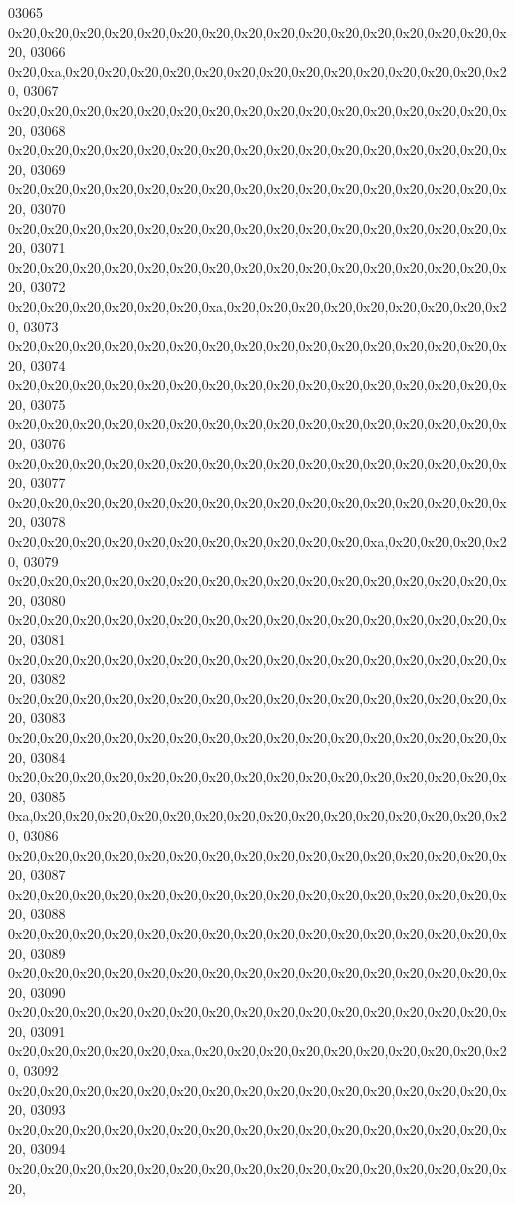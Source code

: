 \begin{DoxyCode}
03065   0x20,0x20,0x20,0x20,0x20,0x20,0x20,0x20,0x20,0x20,0x20,0x20,0x20,0x20,0x20,0x20,
03066   0x20,0xa,0x20,0x20,0x20,0x20,0x20,0x20,0x20,0x20,0x20,0x20,0x20,0x20,0x20,0x20,
03067   0x20,0x20,0x20,0x20,0x20,0x20,0x20,0x20,0x20,0x20,0x20,0x20,0x20,0x20,0x20,0x20,
03068   0x20,0x20,0x20,0x20,0x20,0x20,0x20,0x20,0x20,0x20,0x20,0x20,0x20,0x20,0x20,0x20,
03069   0x20,0x20,0x20,0x20,0x20,0x20,0x20,0x20,0x20,0x20,0x20,0x20,0x20,0x20,0x20,0x20,
03070   0x20,0x20,0x20,0x20,0x20,0x20,0x20,0x20,0x20,0x20,0x20,0x20,0x20,0x20,0x20,0x20,
03071   0x20,0x20,0x20,0x20,0x20,0x20,0x20,0x20,0x20,0x20,0x20,0x20,0x20,0x20,0x20,0x20,
03072   0x20,0x20,0x20,0x20,0x20,0x20,0xa,0x20,0x20,0x20,0x20,0x20,0x20,0x20,0x20,0x20,
03073   0x20,0x20,0x20,0x20,0x20,0x20,0x20,0x20,0x20,0x20,0x20,0x20,0x20,0x20,0x20,0x20,
03074   0x20,0x20,0x20,0x20,0x20,0x20,0x20,0x20,0x20,0x20,0x20,0x20,0x20,0x20,0x20,0x20,
03075   0x20,0x20,0x20,0x20,0x20,0x20,0x20,0x20,0x20,0x20,0x20,0x20,0x20,0x20,0x20,0x20,
03076   0x20,0x20,0x20,0x20,0x20,0x20,0x20,0x20,0x20,0x20,0x20,0x20,0x20,0x20,0x20,0x20,
03077   0x20,0x20,0x20,0x20,0x20,0x20,0x20,0x20,0x20,0x20,0x20,0x20,0x20,0x20,0x20,0x20,
03078   0x20,0x20,0x20,0x20,0x20,0x20,0x20,0x20,0x20,0x20,0x20,0xa,0x20,0x20,0x20,0x20,
03079   0x20,0x20,0x20,0x20,0x20,0x20,0x20,0x20,0x20,0x20,0x20,0x20,0x20,0x20,0x20,0x20,
03080   0x20,0x20,0x20,0x20,0x20,0x20,0x20,0x20,0x20,0x20,0x20,0x20,0x20,0x20,0x20,0x20,
03081   0x20,0x20,0x20,0x20,0x20,0x20,0x20,0x20,0x20,0x20,0x20,0x20,0x20,0x20,0x20,0x20,
03082   0x20,0x20,0x20,0x20,0x20,0x20,0x20,0x20,0x20,0x20,0x20,0x20,0x20,0x20,0x20,0x20,
03083   0x20,0x20,0x20,0x20,0x20,0x20,0x20,0x20,0x20,0x20,0x20,0x20,0x20,0x20,0x20,0x20,
03084   0x20,0x20,0x20,0x20,0x20,0x20,0x20,0x20,0x20,0x20,0x20,0x20,0x20,0x20,0x20,0x20,
03085   0xa,0x20,0x20,0x20,0x20,0x20,0x20,0x20,0x20,0x20,0x20,0x20,0x20,0x20,0x20,0x20,
03086   0x20,0x20,0x20,0x20,0x20,0x20,0x20,0x20,0x20,0x20,0x20,0x20,0x20,0x20,0x20,0x20,
03087   0x20,0x20,0x20,0x20,0x20,0x20,0x20,0x20,0x20,0x20,0x20,0x20,0x20,0x20,0x20,0x20,
03088   0x20,0x20,0x20,0x20,0x20,0x20,0x20,0x20,0x20,0x20,0x20,0x20,0x20,0x20,0x20,0x20,
03089   0x20,0x20,0x20,0x20,0x20,0x20,0x20,0x20,0x20,0x20,0x20,0x20,0x20,0x20,0x20,0x20,
03090   0x20,0x20,0x20,0x20,0x20,0x20,0x20,0x20,0x20,0x20,0x20,0x20,0x20,0x20,0x20,0x20,
03091   0x20,0x20,0x20,0x20,0x20,0xa,0x20,0x20,0x20,0x20,0x20,0x20,0x20,0x20,0x20,0x20,
03092   0x20,0x20,0x20,0x20,0x20,0x20,0x20,0x20,0x20,0x20,0x20,0x20,0x20,0x20,0x20,0x20,
03093   0x20,0x20,0x20,0x20,0x20,0x20,0x20,0x20,0x20,0x20,0x20,0x20,0x20,0x20,0x20,0x20,
03094   0x20,0x20,0x20,0x20,0x20,0x20,0x20,0x20,0x20,0x20,0x20,0x20,0x20,0x20,0x20,0x20,

\end{DoxyCode}
